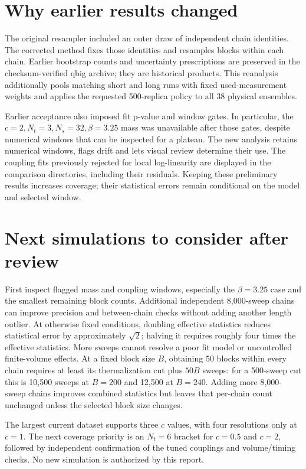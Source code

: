 \documentclass[11pt,a4paper]{article}
\begin{document}
\section*{Why earlier results changed}
The original resampler included an outer draw of independent chain identities.
The corrected method fixes those identities and resamples blocks within
each chain. Earlier bootstrap counts and uncertainty prescriptions are
preserved in the checksum-verified qbig archive; they are historical products.
This reanalysis additionally pools matching short and long runs with fixed
used-measurement weights and applies the requested 500-replica policy to all
38 physical ensembles.

Earlier acceptance also imposed fit p-value and window gates. In particular,
the $c=2,N_t=3,N_s=32,\beta=3.25$ mass was unavailable after those gates,
despite numerical windows that can be inspected for a plateau. The new
analysis retains numerical windows, flags drift and lets visual review
determine their use. The coupling fits previously rejected for local
log-linearity are displayed in the comparison directories, including their
residuals. Keeping these preliminary results increases coverage; their
statistical errors remain conditional on the model and selected window.

\section*{Next simulations to consider after review}
First inspect flagged mass and coupling windows, especially the $\beta=3.25$
case and the smallest remaining block counts. Additional independent
8,000-sweep chains can improve precision and between-chain checks without
adding another length outlier. At otherwise fixed conditions, doubling
effective statistics reduces statistical error by approximately $\sqrt2$;
halving it requires roughly four times the effective statistics. More sweeps
cannot resolve a poor fit model or uncontrolled finite-volume effects.
At a fixed block size $B$, obtaining 50 blocks within every chain requires
at least its thermalization cut plus $50B$ sweeps: for a 500-sweep cut this
is 10,500 sweeps at $B=200$ and 12,500 at $B=240$. Adding more 8,000-sweep
chains improves combined statistics but leaves that per-chain count unchanged
unless the selected block size changes.

The largest current dataset supports three $c$ values, with four resolutions
only at $c=1$. The next coverage priority is an $N_t=6$ bracket for $c=0.5$
and $c=2$, followed by independent confirmation of the tuned couplings and
volume/timing checks. No new simulation is authorized by this report.
\end{document}
